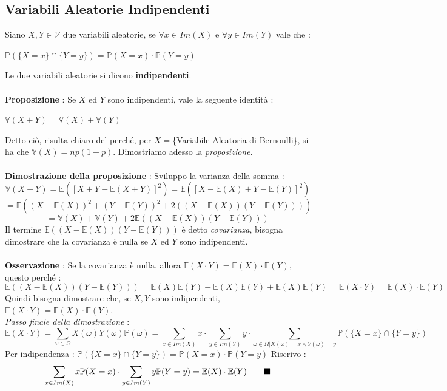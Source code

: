 \documentclass[12pt, letterpaper]{article}
\newcommand{\E}{{\mathbb E}}
\newcommand{\V}{{\mathbb V}}
\newcommand{\Prob}{{\mathbb P}}
\begin{document}
\subsection{Variabili Aleatorie Indipendenti}
Siano \(X,Y\in\mathcal{V}\) due variabili aleatorie, se \(\forall x\in Im(X)\) e \(\forall y\in Im(Y)\) vale che :
\begin{center}
    \(
      \Prob(\{X=x\}\cap\{Y=y\})=\Prob(X=x)\cdot\Prob(Y=y)  
    \)
\end{center}
Le due variabili aleatorie si dicono \textbf{indipendenti}.\\\hphantom{}\\
\textbf{Proposizione} : Se \(X\) ed \(Y\) sono indipendenti, vale la seguente identità :\begin{center}
    \(\V(X+Y)=\V(X)+\V(Y)\)
\end{center}
Detto ciò, risulta chiaro del perché, per \(X=\)\{Variabile Aleatoria di Bernoulli\}, si ha che \(\V(X)=np(1-p)\).
Dimostriamo adesso la \textit{proposizione}.\\\hphantom{}\\
\textbf{Dimostrazione della proposizione} : Sviluppo la varianza della somma :
\begin{equation}
    \V(X+Y)=\E([X+Y-\E(X+Y)]^2)=\E([X-\E(X)+Y-\E(Y)]^2)
\end{equation}
\begin{equation}
    = \E((X-\E(X))^2+(Y-\E(Y))^2+2((X-\E(X))(Y-\E(Y))))
\end{equation}
\begin{equation}
    =\V(X)+\V(Y)+2\E((X-\E(X))(Y-\E(Y)))
\end{equation}
Il termine \(\E((X-\E(X))(Y-\E(Y)))\) è detto \textit{covarianza}, bisogna dimostrare che la covarianza è 
nulla se \(X\) ed \(Y\) sono indipendenti.\\\hphantom{}\\
\textbf{Osservazione} : Se la covarianza è nulla, allora \(\E(X\cdot Y)=\E(X)\cdot\E(Y)\), questo perché :\begin{equation}
    \E((X-\E(X))(Y-\E(Y)))=\E(X)\E(Y)-\E(X)\E(Y)+\E(X)\E(Y)=\E(X\cdot Y)=\E(X)\cdot\E(Y) 
\end{equation}
Quindi bisogna dimostrare che, se \(X,Y\) sono indipendenti, \(\E(X\cdot Y)=\E(X)\cdot\E(Y) \).
\\\textit{Passo finale della dimostrazione} : \begin{equation}
    \E(X\cdot Y)=\sum_{\omega\in \Omega}X(\omega)Y(\omega)\Prob({\omega})=
    \sum_{x\in Im(X)}x\cdot\sum_{y\in Im(Y)}y\cdot\sum_{
        \omega\in\Omega|X(\omega)=x\land Y(\omega)=y
    }\Prob(\{X=x\}\cap\{Y=y\})
\end{equation}
Per indipendenza :  \(
    \Prob(\{X=x\}\cap\{Y=y\})=\Prob(X=x)\cdot\Prob(Y=y)  
  \)
  Riscrivo :
  \begin{equation}
    \sum_{x\in Im(X)}x\Prob(X=x)\cdot\sum_{y\in Im(Y)}y\Prob(Y=y)=\E(X)\cdot\E(Y)\text{\hphantom{aaaa}}\blacksquare
  \end{equation}
\end{document}
